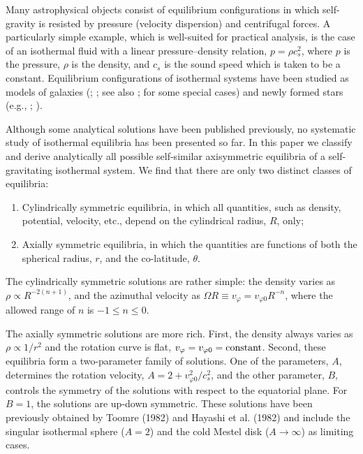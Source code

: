 Many astrophysical objects consist of equilibrium configurations in which
self-gravity is resisted by pressure (velocity dispersion) and centrifugal
forces. A particularly simple example, which is well-suited for practical
analysis, is the case of an isothermal fluid with a linear pressure--density 
relation, $p=\rho c_s^2$, where $p$ is the pressure, $\rho$ is the density,
and $c_s$ is the sound speed which is taken to be a constant. Equilibrium 
configurations of isothermal systems have been studied as models of galaxies
(\cite{Toomre82}; \cite{BT}; see also \cite{Richstone80}; \cite{Monetetal81} 
for some special cases) and newly formed stars
(e.g., \cite{Hayashietal82}; \cite{Kiguchietal87}).

Although some analytical solutions have been published previously, no 
systematic study of isothermal equilibria has been presented so far. In this 
paper we classify and derive analytically all possible self-similar 
axisymmetric equilibria of a self-gravitating isothermal system. We find 
that there are only two distinct classes of equilibria:
\begin{enumerate}
\item
Cylindrically symmetric equilibria, in which all quantities, such as density,
potential, velocity, etc., depend on the cylindrical radius, $R$, only;
\item
Axially symmetric equilibria, in which the quantities are functions of both the
spherical radius, $r$, and the co-latitude, $\theta$.
\end{enumerate} 

The cylindrically symmetric solutions are rather simple: the density varies as
$\rho\propto R^{-2(n+1)}$, and the azimuthal velocity as 
$\Omega R\equiv v_\varphi=v_{\varphi0}R^{-n}$, where the allowed range of 
$n$ is $-1\le n\le 0$.

The axially symmetric solutions are more rich. First, the density  
always varies as $\rho\propto 1/r^2$ and the rotation curve is 
flat, $v_\varphi=v_{\varphi0}={\rm constant}$. Second, these equilibria form
a two-parameter family of solutions. One of the parameters, $A$, determines 
the rotation velocity, $A=2+v_{\varphi0}^2/c_s^2$, and the other parameter, 
$B$, controls the symmetry of the solutions with respect to the equatorial 
plane. For $B=1$, the solutions are up-down symmetric. These solutions have 
been previously obtained by Toomre (1982) and Hayashi et al. (1982) and include
the singular isothermal sphere ($A=2$) and the cold Mestel disk ($A\to\infty$) 
as limiting cases. 

